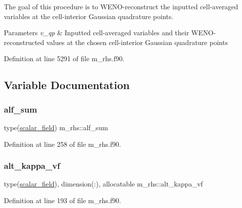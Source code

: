 The goal of this procedure is to W\+E\+N\+O-\/reconstruct the inputted cell-\/averaged variables at the cell-\/interior Gaussian quadrature points. 


\begin{DoxyParams}{Parameters}
{\em v\+\_\+qp} & Inputted cell-\/averaged variables and their W\+E\+N\+O-\/reconstructed values at the chosen cell-\/interior Gaussian quadrature points \\
\hline
\end{DoxyParams}


Definition at line 5291 of file m\+\_\+rhs.\+f90.



\subsection{Variable Documentation}
\mbox{\label{namespacem__rhs_aaaecb99341e4534ec839e9356bf90536}} 
\subsubsection{\texorpdfstring{alf\+\_\+sum}{alf\_sum}}
{\footnotesize\ttfamily type(\hyperlink{structm__derived__types_1_1scalar__field}{scalar\+\_\+field}) m\+\_\+rhs\+::alf\+\_\+sum}



Definition at line 258 of file m\+\_\+rhs.\+f90.

\mbox{\label{namespacem__rhs_adf9ba6fc1bd79727d1f7ce5fe7a302ed}} 
\subsubsection{\texorpdfstring{alt\+\_\+kappa\+\_\+vf}{alt\_kappa\_vf}}
{\footnotesize\ttfamily type(\hyperlink{structm__derived__types_1_1scalar__field}{scalar\+\_\+field}), dimension(\+:), allocatable m\+\_\+rhs\+::alt\+\_\+kappa\+\_\+vf}



Definition at line 193 of file m\+\_\+rhs.\+f90.

\mbox{\label{namespacem__rhs_a09ebe4906d3bb2a6656da08fea5a4e49}} 
